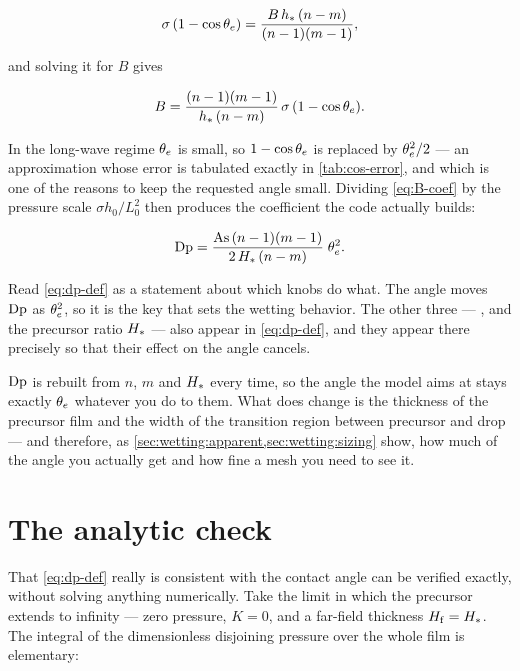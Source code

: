 \begin{equation}\label{eq:energy-balance}
  \sigma\,(1 - \cos\theta_{e})
    = \frac{B\,h_{*}\,(n-m)}{(n-1)(m-1)},
\end{equation}

and solving it for $B$ gives

\begin{equation}\label{eq:B-coef}
  B = \frac{(n-1)(m-1)}{h_{*}\,(n-m)}\,\sigma\,(1 - \cos\theta_{e}).
\end{equation}

In the long-wave regime $\theta_{e}$ is small, so $1-\cos\theta_{e}$ is replaced by
$\theta_{e}^{2}/2$ --- an approximation whose error is tabulated exactly in
\cref{tab:cos-error}, and which is one of the reasons to keep the requested
angle small. Dividing \cref{eq:B-coef} by the pressure scale
$\sigma h_0 / L_0^{2}$ then produces the coefficient the code actually builds:

\begin{equation}\label{eq:dp-def}
  \mathrm{Dp} = \frac{\mathrm{As}\,(n-1)(m-1)}{2\,H_{*}\,(n-m)}\;\theta_{e}^{2}.
\end{equation}

Read \cref{eq:dp-def} as a statement about which knobs do what. The angle
 moves $\mathrm{Dp}$ as $\theta_{e}^{2}$, so it is the key that sets
the wetting behavior. The other three --- ,  and
the precursor ratio $H_{*}$ --- also appear in \cref{eq:dp-def}, and they
appear there precisely so that their effect on the angle cancels.

\begin{note}
  $\mathrm{Dp}$ is rebuilt from $n$, $m$ and $H_{*}$ every time, so the angle the
  model aims at stays exactly $\theta_{e}$ whatever you do to them. What does
  change is the thickness of the precursor film and the width of the transition
  region between precursor and drop --- and therefore, as
  \cref{sec:wetting:apparent,sec:wetting:sizing} show, how much of the angle
  you actually get and how fine a mesh you need to see it.
\end{note}

\section{The analytic check}
\label{sec:wetting:analytic}

That \cref{eq:dp-def} really is consistent with the contact angle can be
verified exactly, without solving anything numerically. Take the limit in which
the precursor extends to infinity --- zero pressure, $K = 0$, and a far-field
thickness $H_{\mathrm{f}} = H_{*}$. The integral of the dimensionless disjoining pressure
over the whole film is elementary:

